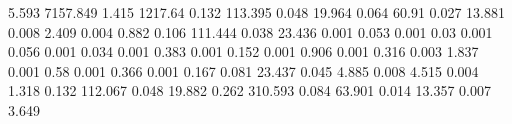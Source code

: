 5.593      7157.849   %
1.415      1217.64    %
0.132      113.395    %
0.048      19.964     %
0.064      60.91      %
0.027      13.881     %
0.008      2.409      %
0.004      0.882      %
0.106      111.444    %
0.038      23.436     %
0.001      0.053      %
0.001      0.03       %
0.001      0.056      %
0.001      0.034      %
0.001      0.383      %
0.001      0.152      %
0.001      0.906      %
0.001      0.316      %
0.003      1.837      %
0.001      0.58       %
0.001      0.366      %
0.001      0.167      %
0.081      23.437     %
0.045      4.885      %
0.008      4.515      %
0.004      1.318      %
0.132      112.067    %
0.048      19.882     %
0.262      310.593    %
0.084      63.901     %
0.014      13.357     %
0.007      3.649      %
